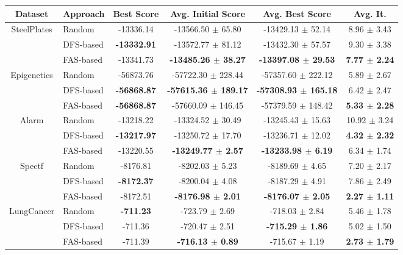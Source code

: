 \begin{tabular}{| c | l | c | c | c | c | }
	\hline
	Dataset & Approach & Best Score & Avg. Initial Score & Avg. Best Score & Avg. It. \\ \hline
				
	\multirow{3}{*}{SteelPlates} & Random & -13336.14 & -13566.50 $\pm$ 65.80 & -13429.13 $\pm$ 52.14 & 8.96 $\pm$ 3.43 \\ \cline{2-6} 
			& DFS-based & \textbf{-13332.91} & -13572.77 $\pm$ 81.12 & -13432.30 $\pm$ 57.57 & 9.30 $\pm$ 3.38 \\ \cline{2-6}
			& FAS-based & -13341.73 & \textbf{-13485.26 $\pm$ 38.27} & \textbf{-13397.08 $\pm$ 29.53} & \textbf{7.77 $\pm$ 2.24} \\ \hline \hline
						
	\multirow{3}{*}{Epigenetics} & Random & -56873.76 & -57722.30 $\pm$ 228.44 & -57357.60 $\pm$ 222.12 & 5.89 $\pm$ 2.67 \\ \cline{2-6} 
			& DFS-based & \textbf{-56868.87} & \textbf{-57615.36 $\pm$ 189.17} & \textbf{-57308.93 $\pm$ 165.18} & 6.42 $\pm$ 2.47 \\ \cline{2-6}
			& FAS-based & \textbf{-56868.87} & -57660.09 $\pm$ 146.45 & -57379.59 $\pm$ 148.42 & \textbf{5.33 $\pm$ 2.28} \\ \hline \hline

	\multirow{3}{*}{Alarm} & Random & -13218.22 & -13324.52 $\pm$ 30.49 & -13245.43 $\pm$ 15.63 & 10.92 $\pm$ 3.24 \\ \cline{2-6} 
			& DFS-based & \textbf{-13217.97} & -13250.72 $\pm$ 17.70 & -13236.71 $\pm$ 12.02 & \textbf{4.32 $\pm$ 2.32} \\ \cline{2-6}
			& FAS-based & -13220.55 & \textbf{-13249.77 $\pm$ 2.57} & \textbf{-13233.98 $\pm$ 6.19} & 6.34 $\pm$ 1.74 \\ \hline \hline

	\multirow{3}{*}{Spectf} & Random & -8176.81 & -8202.03 $\pm$ 5.23 & -8189.69 $\pm$ 4.65 & 7.20 $\pm$ 2.17 \\ \cline{2-6} 
			& DFS-based & \textbf{-8172.37} & -8200.04 $\pm$ 4.08 & -8187.29 $\pm$ 4.91 & 7.86 $\pm$ 2.49 \\ \cline{2-6}
			& FAS-based & -8172.51 & \textbf{-8176.98 $\pm$ 2.01} & \textbf{-8176.07 $\pm$ 2.05} & \textbf{2.27 $\pm$ 1.11} \\ \hline \hline 
					
	\multirow{3}{*}{LungCancer} & Random & \textbf{-711.23} & -723.79 $\pm$ 2.69 & -718.03 $\pm$ 2.84 & 5.46 $\pm$ 1.78 \\ \cline{2-6} 
			& DFS-based & -711.36 & -720.47 $\pm$ 2.51 & \textbf{-715.29 $\pm$ 1.86} & 5.02 $\pm$ 1.50 \\ \cline{2-6}
			& FAS-based & -711.39 & \textbf{-716.13 $\pm$ 0.89} & -715.67 $\pm$ 1.19 & \textbf{2.73 $\pm$ 1.79} \\ \hline
\end{tabular}
